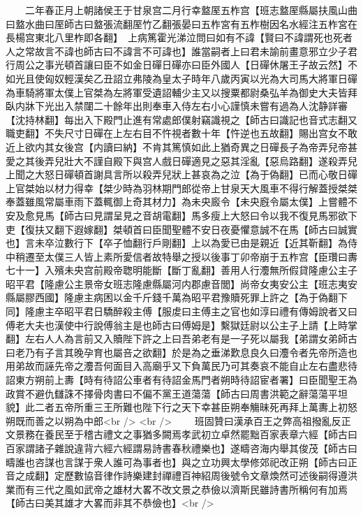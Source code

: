 　　二年春正月上朝諸侯王于甘泉宫二月行幸盩厔五柞宫【班志盩厔縣屬扶風山曲曰盩水曲曰厔師古曰盩張流翻厔竹乙翻張晏曰五柞宮有五柞樹因名水經注五柞宮在長楊宫東北八里柞即各翻】　上病篤霍光涕泣問曰如有不諱【賢曰不諱謂死也死者人之常故言不諱也師古曰不諱言不可諱也】誰當嗣者上曰君未諭前畫意邪立少子君行周公之事光頓首讓曰臣不如金日磾日磾亦曰臣外國人【日磾休屠王子故云然】不如光且使匈奴輕漢矣乙丑詔立弗陵為皇太子時年八歲丙寅以光為大司馬大將軍日磾為車騎將軍太僕上官桀為左將軍受遺詔輔少主又以搜粟都尉桑弘羊為御史大夫皆拜臥内牀下光出入禁闥二十餘年出則奉車入侍左右小心謹慎未嘗有過為人沈静詳審【沈持林翻】每出入下殿門止進有常處郎僕射竊識視之【師古曰識記也音式志翻又職吏翻】不失尺寸日磾在上左右目不忤視者數十年【忤逆也五故翻】賜出宫女不敢近上欲内其女後宫【内讀曰納】不肯其篤慎如此上猶奇異之日磾長子為帝弄兒帝甚愛之其後弄兒壯大不謹自殿下與宫人戲日磾適見之惡其淫亂【惡烏路翻】遂殺弄兒上聞之大怒日磾頓首謝具言所以殺弄兒狀上甚哀為之泣【為于偽翻】已而心敬日磾上官桀始以材力得幸【桀少時為羽林期門郎從帝上甘泉天大風車不得行解蓋授桀桀奉蓋雖風常屬車雨下蓋輒御上奇其材力】為未央廄令【未央廐令屬太僕】上嘗體不安及愈見馬【師古曰見謂呈見之音胡電翻】馬多瘦上大怒曰令以我不復見馬邪欲下吏【復扶又翻下遐嫁翻】桀頓首曰臣聞聖體不安日夜憂懼意誠不在馬【師古曰誠實也】言未卒泣數行下【卒子恤翻行戶剛翻】上以為愛已由是親近【近其靳翻】為侍中稍遷至太僕三人皆上素所愛信者故特舉之授以後事丁卯帝崩于五柞宫【臣瓚曰夀七十一】入殯未央宫前殿帝聦明能斷【斷丁亂翻】善用人行灋無所假貸隆慮公主子昭平君【隆慮公主景帝女班志隆慮縣屬河内郡慮音閭】尚帝女夷安公主【班志夷安縣屬膠西國】隆慮主病困以金千斤錢千萬為昭平君豫贖死罪上許之【為于偽翻下同】隆慮主卒昭平君日驕醉殺主傅【服䖍曰主傅主之官也如淳曰禮有傳姆說者又曰傅老大夫也漢使中行說傅翁主是也師古曰傅姆是】繫獄廷尉以公主子上請【上時掌翻】左右人人為言前又入贖陛下許之上曰吾弟老有是一子死以屬我【弟謂女弟師古曰老乃有子言其晚孕育也屬咅之欲翻】於是為之垂涕歎息良久曰灋令者先帝所造也用弟故而誣先帝之灋吾何面目入高廟乎又下負萬民乃可其奏哀不能自止左右盡悲待詔東方朔前上夀【時有待詔公車者有待詔金馬門者朔時待詔宦者署】曰臣聞聖王為政賞不避仇讎誅不擇骨肉書曰不偏不黨王道蕩蕩【師古曰周書洪範之辭蕩蕩平坦貌】此二者五帝所重三王所難也陛下行之天下幸甚臣朔奉觴昧死再拜上萬夀上初怒朔既而善之以朔為中郎<br />
<br />
　　班固贊曰漢承百王之弊高祖撥亂反正文景務在養民至于稽古禮文之事猶多闕焉孝武初立卓然罷黜百家表章六經【師古曰百家謂諸子雜說違背六經六經謂易詩書春秋禮樂也】遂疇咨海内舉其俊茂【師古曰疇誰也咨謀也言謀于衆人誰可為事者也】與之立功興太學修郊祀改正朔【師古曰正音之成翻】定歷數協音律作詩樂建封禪禮百神紹周後號令文章煥然可述後嗣得遵洪業而有三代之風如武帝之雄材大畧不改文景之恭儉以濟斯民雖詩書所稱何有加焉【師古曰美其雄才大畧而非其不恭儉也】<br />
